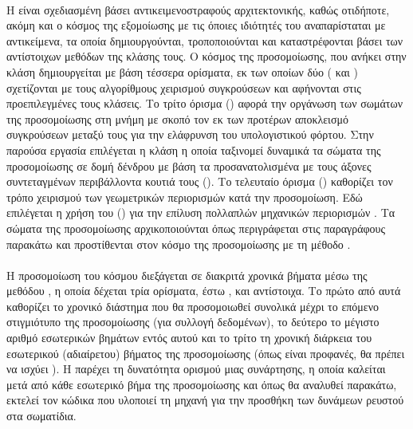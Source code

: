 \paragraph{} Η  είναι σχεδιασμένη βάσει αντικειμενοστραφούς αρχιτεκτονικής,
καθώς οτιδήποτε, ακόμη και ο κόσμος της εξομοίωσης με τις όποιες ιδιότητές του
αναπαρίσταται με αντικείμενα, τα οποία δημιουργούνται, τροποποιούνται και καταστρέφονται
βάσει των αντίστοιχων μεθόδων της κλάσης τους. Ο κόσμος της προσομοίωσης, που ανήκει στην
κλάση  δημιουργείται με βάση τέσσερα ορίσματα, εκ των οποίων
δύο ( και ) σχετίζονται με τους
αλγορίθμους χειρισμού συγκρούσεων και αφήνονται στις προεπιλεγμένες τους κλάσεις. Το τρίτο
όρισμα () αφορά την οργάνωση των σωμάτων της προσομοίωσης στη
μνήμη με σκοπό τον εκ των προτέρων αποκλεισμό συγκρούσεων μεταξύ τους για την ελάφρυνση
του υπολογιστικού φόρτου. Στην παρούσα εργασία επιλέγεται η κλάση  η
οποία ταξινομεί δυναμικά τα σώματα της προσομοίωσης σε δομή δένδρου με βάση τα
προσανατολισμένα με τους άξονες συντεταγμένων περιβάλλοντα κουτιά τους (). Το
τελευταίο όρισμα () καθορίζει τον τρόπο χειρισμού των γεωμετρικών
περιορισμών κατά την προσομοίωση. Εδώ επιλέγεται η χρήση του  () για την επίλυση πολλαπλών μηχανικών περιορισμών
\cite{catto2005iterative}. Τα σώματα της προσομοίωσης αρχικοποιούνται όπως περιγράφεται
στις παραγράφους παρακάτω και προστίθενται στον κόσμο της προσομοίωσης με τη μέθοδο
.

\paragraph{} Η προσομοίωση του κόσμου διεξάγεται σε διακριτά χρονικά βήματα μέσω της
μεθόδου , η οποία δέχεται τρία ορίσματα, έστω ,  και
 αντίστοιχα. Το πρώτο από αυτά καθορίζει το χρονικό διάστημα που θα προσομοιωθεί
συνολικά μέχρι το επόμενο στιγμιότυπο της προσομοίωσης (για συλλογή δεδομένων), το δεύτερο
το μέγιστο αριθμό εσωτερικών βημάτων εντός αυτού και το τρίτο τη χρονική διάρκεια του
εσωτερικού (αδιαίρετου) βήματος της προσομοίωσης (όπως είναι προφανές, θα πρέπει να ισχύει
).
Η  παρέχει τη δυνατότητα ορισμού μιας  συνάρτησης, η οποία
καλείται μετά από κάθε εσωτερικό βήμα της προσομοίωσης και όπως θα αναλυθεί παρακάτω,
εκτελεί τον κώδικα που υλοποιεί τη μηχανή  για την προσθήκη των δυνάμεων ρευστού
στα σωματίδια.

